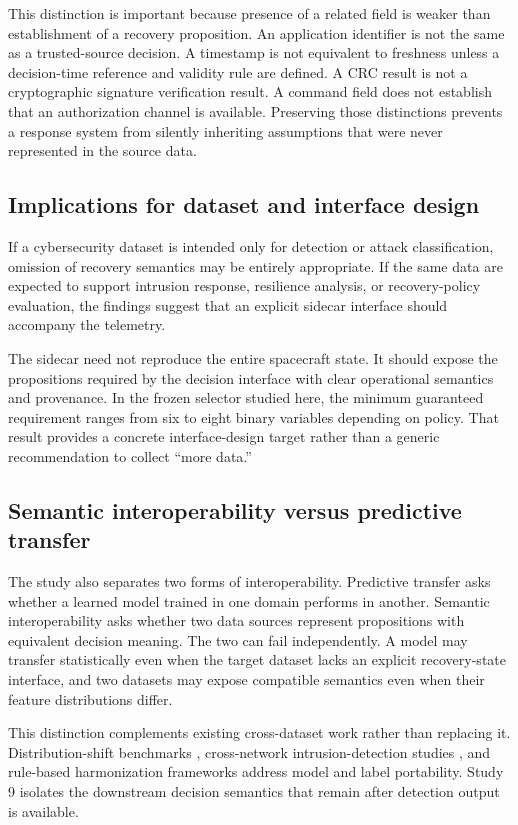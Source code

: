 \documentclass[preprint,12pt]{elsarticle}
\begin{document}
This distinction is important because presence of a related field is weaker than establishment of a recovery proposition. An application identifier is not the same as a trusted-source decision. A timestamp is not equivalent to freshness unless a decision-time reference and validity rule are defined. A CRC result is not a cryptographic signature verification result. A command field does not establish that an authorization channel is available. Preserving those distinctions prevents a response system from silently inheriting assumptions that were never represented in the source data.

\subsection{Implications for dataset and interface design}

If a cybersecurity dataset is intended only for detection or attack classification, omission of recovery semantics may be entirely appropriate. If the same data are expected to support intrusion response, resilience analysis, or recovery-policy evaluation, the findings suggest that an explicit sidecar interface should accompany the telemetry.

The sidecar need not reproduce the entire spacecraft state. It should expose the propositions required by the decision interface with clear operational semantics and provenance. In the frozen selector studied here, the minimum guaranteed requirement ranges from six to eight binary variables depending on policy. That result provides a concrete interface-design target rather than a generic recommendation to collect ``more data.''

\subsection{Semantic interoperability versus predictive transfer}

The study also separates two forms of interoperability. Predictive transfer asks whether a learned model trained in one domain performs in another. Semantic interoperability asks whether two data sources represent propositions with equivalent decision meaning. The two can fail independently. A model may transfer statistically even when the target dataset lacks an explicit recovery-state interface, and two datasets may expose compatible semantics even when their feature distributions differ.

This distinction complements existing cross-dataset work rather than replacing it. Distribution-shift benchmarks \cite{koh2021wilds}, cross-network intrusion-detection studies \cite{cerasuolo2026transfer}, and rule-based harmonization frameworks \cite{rodriguez2026harmonization} address model and label portability. Study 9 isolates the downstream decision semantics that remain after detection output is available.
\end{document}
